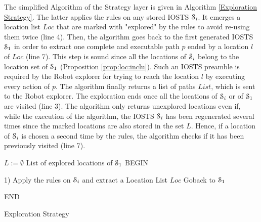 The simplified Algorithm of the Strategy layer is given in
Algorithm \ref{Exploration Strategy}. The latter applies the
rules on any stored IOSTS $\EuScript{S}_i$. It emerges a
location list $Loc$ that are marked with "explored" by the rules
to avoid re-using them twice (line 4). Then, the algorithm goes
back to the first generated IOSTS $\EuScript{S}_1$ in order to
extract one complete and executable path $p$ ended by a location
$l$ of $Loc$ (line 7). This step is sound since all the locations
of $\EuScript{S}_i$ belong to the location set of
$\EuScript{S}_1$ (Proposition \ref{prop:loc:inclu}). Such an
IOSTS preamble is required by the Robot explorer for trying to
reach the location $l$ by executing every action of $p$. The
algorithm finally returns a list of paths $List$, which is sent
to the Robot explorer. The exploration ends once all the
locations of $\EuScript{S}_i$ or of $\EuScript{S}_1$ are visited
(line 3). The algorithm only returns unexplored locations even
if, while the execution of the algorithm, the IOSTS
$\EuScript{S}_i$ has been regenerated several times since the
marked locations are also stored in the set $L$. Hence, if a
location of $\EuScript{S}_i$ is chosen a second time by the
rules, the algorithm checks if it has been previously visited
(line 7).

\begin{algorithm}
 


$L:=\emptyset$ List of explored locations of $\EuScript{S}_1$\;
BEGIN\;
{
1) Apply the rules on $\EuScript{S}_i$ and extract a  Location List $Loc$\;
Goback to $\EuScript{S}_1$\;

}
END\;

\caption{Exploration Strategy}
 \label{Exploration Strategy}
\end{algorithm}

